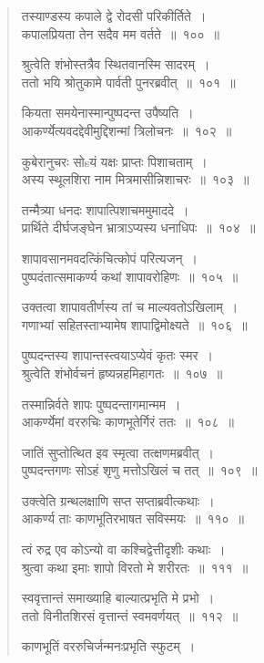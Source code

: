\documentclass[11pt, openany]{book}
\begin{document}
\begin{multicols}{2}
\begin{quote}
{तस्याण्डस्य कपाले द्वे रोदसी परिकीर्तिते~।\\
कपालप्रियता तेन सदैव मम वर्तते~॥~१००~॥

श्रुत्वेति शंभोस्तत्रैव स्थितवानस्मि सादरम्~।\\
ततो भयि श्रोतुकामे पार्वती पुनरब्रवीत्~॥~१०१~॥

कियता समयेनास्मान्पुष्पदन्त उपैष्यति~।\\
आकर्ण्येत्यवदद्देवीमुद्दिशन्मां त्रिलोचनः~॥~१०२~॥

कुबेरानुचरः सोsयं यक्षः प्राप्तः पिशाचताम्~।\\
अस्य स्थूलशिरा नाम मित्रमासीन्निशाचरः~॥~१०३~॥

तन्मैत्र्या धनदः शापात्पिशाचममुमाददे~।\\
प्रार्थिते दीर्घजङ्घेन भ्रात्राऽप्यस्य धनाधिपः~॥~१०४~॥

शापावसानमवदत्किंचित्कोपं परित्यजन्~।\\
पुष्पदंतात्समाकर्ण्य कथां शापावरोहिणः~॥~१०५~॥

उक्तत्वा शापावतीर्णस्य तां च माल्यवतोऽखिलाम्~।\\
गणाभ्यां सहितस्ताभ्यामेष शापाद्विमोक्ष्यते~॥~१०६~॥

पुष्पदन्तस्य शापान्तस्त्वयाऽप्येवं कृतः स्मर~।\\
श्रुत्वेति शंभोर्वचनं हृष्यन्नहमिहागतः~॥~१०७~॥

तस्मान्निर्वते शापः पुष्पदन्तागमान्मम~।\\
आकर्ण्येमां वररुचिः काणभूतेर्गिरं ततः~॥~१०८~॥

जातिं सुप्तोत्थित इव स्मृत्वा तत्क्षणमब्रवीत्~।\\
पुष्पदन्तगणः सोऽहं शृणु मत्तोऽखिलं च तत्~॥~१०९~॥

उक्त्वेति ग्रन्थलक्षाणि सप्त सप्ताब्रवीत्कथाः~।\\
आकर्ण्य ताः काणभूतिरभाषत सविस्मयः~॥~११०~॥

त्वं रुद्र एव कोऽन्यो वा कश्चिद्वेत्तीदृशीः कथाः~।\\
श्रुत्वा कथा इमाः शापो विरतो मे शरीरतः~॥~१११~॥

स्ववृत्तान्तं समाख्याहि बाल्यात्प्रभृति मे प्रभो~।\\
ततो विनीतशिरसं वृत्तान्तं स्वमवर्णयत्~॥~११२~॥

काणभूतिं वररुचिर्जन्मनःप्रभृति स्फुटम्~।}
\end{quote}
\end{multicols}

\newpage
\end{document}
